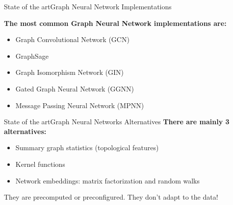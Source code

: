 \documentclass[xcolor=table]{beamer}
\begin{document}









\begin{frame}{State of the art}{Graph Neural Network Implementations}

\textbf{The most common Graph Neural Network implementations are:}
\begin{itemize}
    \item Graph Convolutional Network (GCN)
    \item GraphSage
    \item Graph Isomorphism Network (GIN)
    \item Gated Graph Neural Network (GGNN)
    \item Message Passing Neural Network (MPNN)
\end{itemize}


\end{frame}




\begin{frame}{State of the art}{Graph Neural Networks Alternatives}
\textbf{There are mainly 3 alternatives:}
\begin{itemize}
    \item Summary graph statistics (topological features)
    \item Kernel functions
    \item Network embeddings: matrix factorization and random walks
\end{itemize}
\vspace{15px}
They are precomputed or preconfigured. They don't adapt to the data!

\end{frame}
\end{document}
